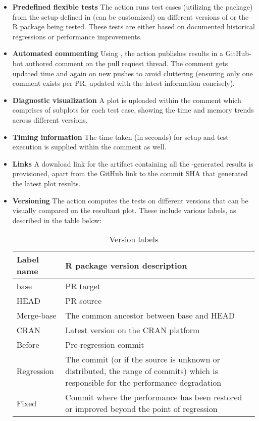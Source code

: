 \begin{itemize}
    \item \textbf{Predefined flexible tests} 
    \newline
    The action runs test cases (utilizing the  package) from the setup defined in  (can be customized) on different versions of  or the R package being tested. These tests are either based on documented historical regressions or performance improvements.
    \item \textbf{Automated commenting}
    \newline
    Using , the action publishes results in a GitHub-bot authored comment on the pull request thread. The comment gets updated time and again on new pushes to avoid cluttering (ensuring only one comment exists per PR, updated with the latest information concisely). 
    \item \textbf{Diagnostic visualization}
    \newline
    A plot is uploaded within the comment which comprises of subplots for each test case, showing the time and memory trends across different  versions.
    \item \textbf{Timing information}
    \newline
    The time taken (in seconds) for setup and test execution is supplied within the comment as well.
    \item \textbf{Links}
    \newline
    A download link for the artifact containing all the -generated results is provisioned, apart from the GitHub link to the commit SHA that generated the latest plot results.
    \item \textbf{Versioning}
    \newline
    The action computes the tests on different  versions that can be visually compared on the resultant plot. These include various labels, as described in the table below:
    \begin{table}[H]
        \centering
            \caption{Version labels}
        \begin{tabular}    
        {|m{1.9cm}|m{10.8cm}|}
  \hline
  Label name & R package version description \\
  \hline
  base & PR target  \\
  \hline
  HEAD & PR source  \\
  \hline  
  Merge-base & The common ancestor between base and HEAD \\
  \hline
  CRAN & Latest version on the CRAN platform  \\
  \hline
  Before & Pre-regression commit  \\
  \hline
  Regression & The commit (or if the source is unknown or distributed, the range of commits) which is responsible for the performance degradation \\
  \hline  
   Fixed & Commit where the performance has been restored or improved beyond the point of regression \\
  \hline
    \end{tabular}
\end{table}
\end{itemize}

